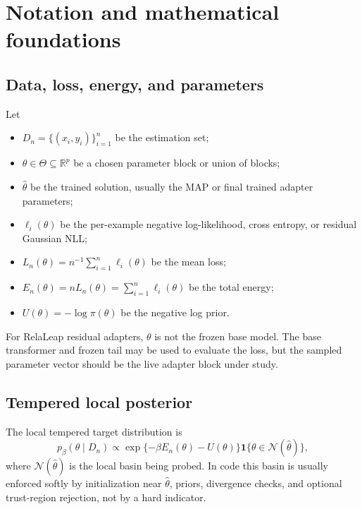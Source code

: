 \documentclass[11pt]{article}
\begin{document}
\section{Notation and mathematical foundations}

\subsection{Data, loss, energy, and parameters}

Let
\begin{itemize}
\item $D_n = \{(x_i,y_i)\}_{i=1}^n$ be the estimation set;
\item $\theta \in \Theta \subseteq \mathbb{R}^p$ be a chosen parameter block or union of blocks;
\item $\hat\theta$ be the trained solution, usually the MAP or final trained adapter parameters;
\item $\ell_i(\theta)$ be the per-example negative log-likelihood, cross entropy, or residual Gaussian NLL;
\item $L_n(\theta) = n^{-1}\sum_{i=1}^n \ell_i(\theta)$ be the mean loss;
\item $E_n(\theta) = n L_n(\theta) = \sum_{i=1}^n \ell_i(\theta)$ be the total energy;
\item $U(\theta) = -\log \pi(\theta)$ be the negative log prior.
\end{itemize}

For RelaLeap residual adapters, $\theta$ is not the frozen base model.  The base transformer and frozen tail may be used to evaluate the loss, but the sampled parameter vector should be the live adapter block under study.

\subsection{Tempered local posterior}

The local tempered target distribution is
\begin{equation}
  p_\beta(\theta \mid D_n)
  \propto
  \exp\{-\beta E_n(\theta) - U(\theta)\}
  \mathbf{1}\{\theta \in \mathcal{N}(\hat\theta)\},
\end{equation}
where $\mathcal{N}(\hat\theta)$ is the local basin being probed.  In code this basin is usually enforced softly by initialization near $\hat\theta$, priors, divergence checks, and optional trust-region rejection, not by a hard indicator.
\end{document}
